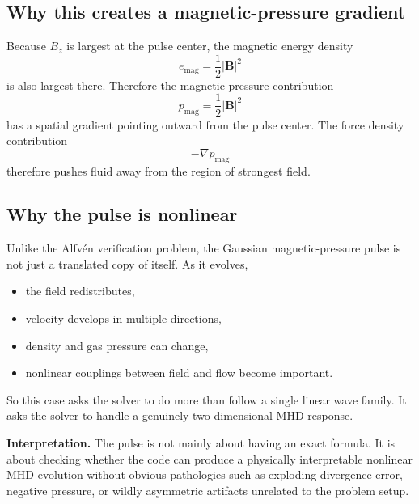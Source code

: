 \documentclass[11pt]{article}
\newcommand{\Bvec}{\mathbf{B}}
\begin{document}
\subsection{Why this creates a magnetic-pressure gradient}
Because $B_z$ is largest at the pulse center, the magnetic energy density
\begin{equation}
e_{\mathrm{mag}} = \frac12 |\Bvec|^2
\end{equation}
is also largest there. Therefore the magnetic-pressure contribution
\begin{equation}
p_{\mathrm{mag}}=\frac12 |\Bvec|^2
\end{equation}
has a spatial gradient pointing outward from the pulse center. The force density contribution
\begin{equation}
-\nabla p_{\mathrm{mag}}
\end{equation}
therefore pushes fluid away from the region of strongest field.

\subsection{Why the pulse is nonlinear}
Unlike the Alfv\'en verification problem, the Gaussian magnetic-pressure pulse is not just a translated copy of itself. As it evolves,
\begin{itemize}[leftmargin=1.8em]
    \item the field redistributes,
    \item velocity develops in multiple directions,
    \item density and gas pressure can change,
    \item nonlinear couplings between field and flow become important.
\end{itemize}
So this case asks the solver to do more than follow a single linear wave family. It asks the solver to handle a genuinely two-dimensional MHD response.

\begin{physicsbox}
\textbf{Interpretation.} The pulse is not mainly about having an exact formula. It is about checking whether the code can produce a physically interpretable nonlinear MHD evolution without obvious pathologies such as exploding divergence error, negative pressure, or wildly asymmetric artifacts unrelated to the problem setup.
\end{physicsbox}
\end{document}
